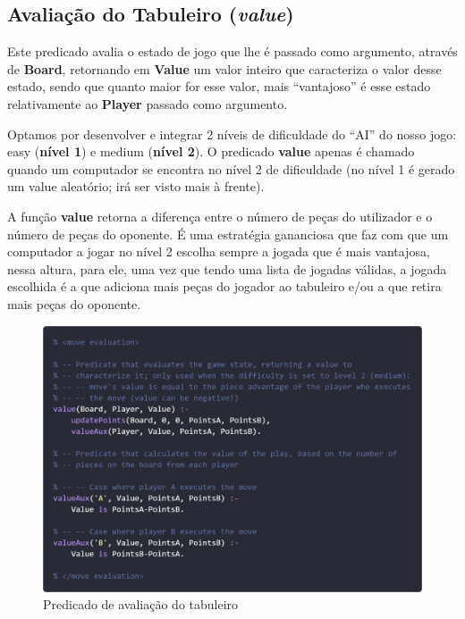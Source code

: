 \documentclass[a4paper]{article}
\begin{document}
\newpage\subsection{Avaliação do Tabuleiro (\textit{value})}

\bigskip
Este predicado avalia o estado de jogo que lhe é passado como argumento, através de \textbf{Board}, retornando em \textbf{Value} um valor inteiro que caracteriza o valor desse estado, sendo que quanto maior for esse valor, mais “vantajoso” é esse estado relativamente ao \textbf{Player} passado como argumento.

\bigskip
Optamos por desenvolver e integrar 2 níveis de dificuldade do “AI” do nosso jogo: easy (\textbf{nível 1}) e medium (\textbf{nível 2}). O predicado \textbf{value} apenas é chamado quando um computador se encontra no nível 2 de dificuldade (no nível 1 é gerado um value aleatório; irá ser visto mais à frente).

\bigskip
A função \textbf{value} retorna a diferença entre o número de peças do utilizador e o número de peças do oponente. É uma estratégia gananciosa que faz com que um computador a jogar no nível 2 escolha sempre a jogada que é mais vantajosa, nessa altura, para ele, uma vez que tendo uma lista de jogadas válidas, a jogada escolhida é a que adiciona mais peças do jogador ao tabuleiro e/ou a que retira mais peças do oponente.

\bigskip
\begin{figure}[hbp!]
    \centering
    \includegraphics[width=\linewidth]{prints/move-evaluation.png}
    \caption{Predicado de avaliação do tabuleiro}
    \label{fig}
\end{figure}
\end{document}
